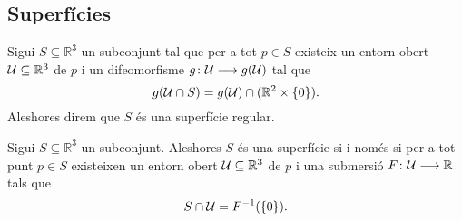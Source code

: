 \documentclass[../Apunts.tex]{subfiles}
\begin{document}
	\subsection{Superfícies}
	\begin{definition}[Superfície]
		\label{def:superfície}
		Sigui \(S\subseteq\mathbb{R}^{3}\) un subconjunt tal que per a tot \(p\in S\) existeix un entorn obert \(\mathcal{U}\subseteq\mathbb{R}^{3}\) de \(p\) i un difeomorfisme \(g\colon\mathcal{U}\longrightarrow g(\mathcal{U})\) tal que
		\[g(\mathcal{U}\cap S)=g(\mathcal{U})\cap(\mathbb{R}^{2}\times\{0\}).\]
		Aleshores direm que \(S\) és una superfície regular.
	\end{definition}
	\begin{theorem}
		\label{thm:condicions equivalents a la definició de superfície}
		Sigui \(S\subseteq\mathbb{R}^{3}\) un subconjunt. Aleshores \(S\) és una superfície si i només si per a tot punt \(p\in S\) existeixen un entorn obert \(\mathcal{U}\subseteq\mathbb{R}^{3}\) de \(p\) i una submersió \(F\colon\mathcal{U}\longrightarrow\mathbb{R}\) tals que
		\[S\cap\mathcal{U}=F^{-1}(\{0\}).\]
	\end{theorem}
\end{document}
